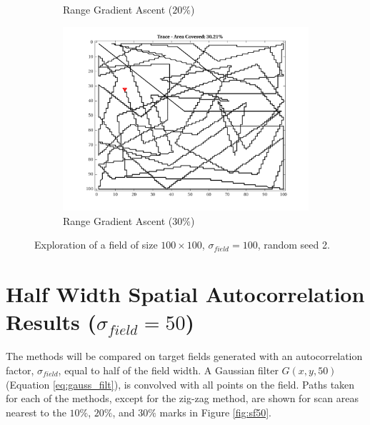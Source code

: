 \begin{figure}[htb!]
\begin{subfigure}[t]{0.32\textwidth}
        \ssp
        \captionsetup{skip=0.20\baselineskip,size=footnotesize}
        \caption{Range Gradient Ascent ($20\%$)}
    \end{subfigure}%
    \begin{subfigure}[t]{0.32\textwidth}
        \centering
        \includegraphics[width=\linewidth]{figures/hbresults/path_gr_30p_100x100_sf_100_seed_2.png}
        \ssp
        \captionsetup{skip=0.20\baselineskip,size=footnotesize}
        \caption{Range Gradient Ascent ($30\%$)}
    \end{subfigure}%
    \ssp
    \captionsetup{skip=0.20\baselineskip}
    \caption{Exploration of a field of size $100 \times 100$, $\sigma_{field} = 100$, random seed 2.}
    \label{fig:sf100}
\end{figure}

\FloatBarrier
\clearpage

\section{Half Width Spatial Autocorrelation Results ($\sigma_{field} = 50$)} \label{sec:sigma50}

The methods will be compared on target fields generated with an autocorrelation factor, $\sigma_{field}$, equal to half of the field width. A Gaussian filter $G(x,y,50)$ (Equation \ref{eq:gauss_filt}), is convolved with all points on the field. Paths taken for each of the methods, except for the zig-zag method, are shown for scan areas nearest to the $10\%$, $20\%$, and $30\%$ marks in Figure \ref{fig:sf50}. \\\\

